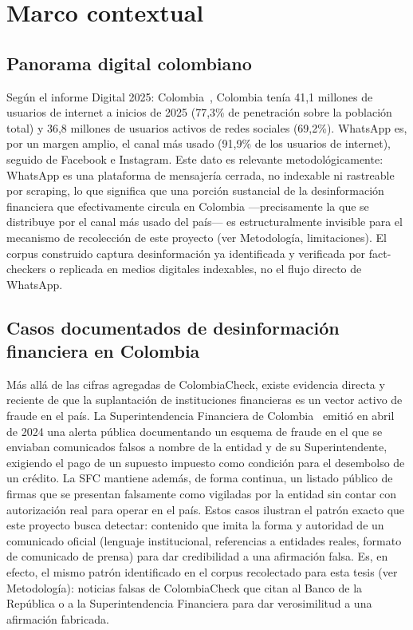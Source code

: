 \section{Marco contextual}

\subsection{Panorama digital colombiano}

Según el informe Digital 2025: Colombia~\cite{Kemp2025}, Colombia tenía 41,1 millones de usuarios de internet a inicios de 2025 (77,3\% de penetración sobre la población total) y 36,8 millones de usuarios activos de redes sociales (69,2\%). WhatsApp es, por un margen amplio, el canal más usado (91,9\% de los usuarios de internet), seguido de Facebook e Instagram. Este dato es relevante metodológicamente: WhatsApp es una plataforma de mensajería cerrada, no indexable ni rastreable por scraping, lo que significa que una porción sustancial de la desinformación financiera que efectivamente circula en Colombia —precisamente la que se distribuye por el canal más usado del país— es estructuralmente invisible para el mecanismo de recolección de este proyecto (ver Metodología, limitaciones). El corpus construido captura desinformación ya identificada y verificada por fact-checkers o replicada en medios digitales indexables, no el flujo directo de WhatsApp.

\subsection{Casos documentados de desinformación financiera en Colombia}

Más allá de las cifras agregadas de ColombiaCheck, existe evidencia directa y reciente de que la suplantación de instituciones financieras es un vector activo de fraude en el país. La Superintendencia Financiera de Colombia~\cite{SFC2024Suplantacion} emitió en abril de 2024 una alerta pública documentando un esquema de fraude en el que se enviaban comunicados falsos a nombre de la entidad y de su Superintendente, exigiendo el pago de un supuesto impuesto como condición para el desembolso de un crédito. La SFC mantiene además, de forma continua, un listado público de firmas que se presentan falsamente como vigiladas por la entidad sin contar con autorización real para operar en el país. Estos casos ilustran el patrón exacto que este proyecto busca detectar: contenido que imita la forma y autoridad de un comunicado oficial (lenguaje institucional, referencias a entidades reales, formato de comunicado de prensa) para dar credibilidad a una afirmación falsa. Es, en efecto, el mismo patrón identificado en el corpus recolectado para esta tesis (ver Metodología): noticias falsas de ColombiaCheck que citan al Banco de la República o a la Superintendencia Financiera para dar verosimilitud a una afirmación fabricada.

